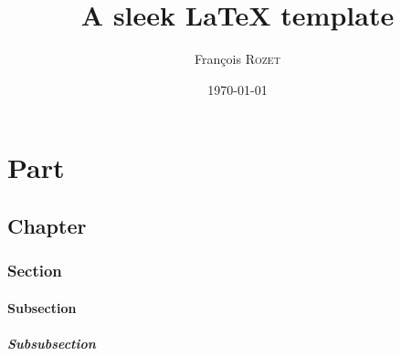 \documentclass[a4paper, 12pt]{report}
\institute{Random University}
\title{A sleek \LaTeX{} template}
\author{François \textsc{Rozet}}
\date{\today}
\begin{document}
	\maketitle
	\romantableofcontents
	
	\part{Part}
	\chapter{Chapter}
	\section{Section}
	\subsection{Subsection}
	\subsubsection{Subsubsection}

	\nocite{einstein}
    \nocite{knuthwebsite}
	\printbibliography
\end{document}
